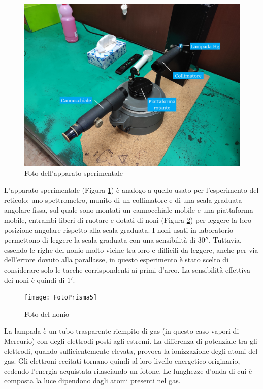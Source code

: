 \documentclass{article}
\begin{document}
\vspace{5mm}

\begin{figure}[h]
  \centering
  \includegraphics[width=0.6\linewidth]{FotoPrisma1}
  \caption{Foto dell'apparato sperimentale}
  \label{Foto_grande}
\end{figure}

L'apparato sperimentale (Figura \ref{Foto_grande}) è analogo a quello usato per l'esperimento del reticolo: uno spettrometro, munito di un collimatore e di una scala graduata angolare fissa, sul quale sono montati un cannocchiale mobile e una piattaforma mobile, entrambi liberi di ruotare e dotati di noni (Figura \ref{Foto_nonio}) per leggere la loro posizione angolare rispetto alla scala graduata. I noni usati in laboratorio permettono di leggere la scala graduata con una sensibilità di $30''$. Tuttavia, essendo le righe del nonio molto vicine tra loro e difficili da leggere, anche per via dell'errore dovuto alla parallasse, in questo esperimento è stato scelto di considerare solo le tacche corrispondenti ai primi d'arco. La sensibilità effettiva dei noni è quindi di $1'$.

\begin{figure}[h]
  \centering
  \texttt{[image: FotoPrisma5]}
  \caption{Foto del nonio}
  \label{Foto_nonio}
\end{figure}

\vspace{5mm}

La lampada è un tubo trasparente riempito di gas (in questo caso vapori di Mercurio) con degli elettrodi posti agli estremi. La differenza di potenziale tra gli elettrodi, quando sufficientemente elevata, provoca la ionizzazione degli atomi del gas. Gli elettroni eccitati tornano quindi al loro livello energetico originario, cedendo l'energia acquistata rilasciando un fotone. Le lunghezze d'onda di cui è composta la luce dipendono dagli atomi presenti nel gas.
\end{document}
